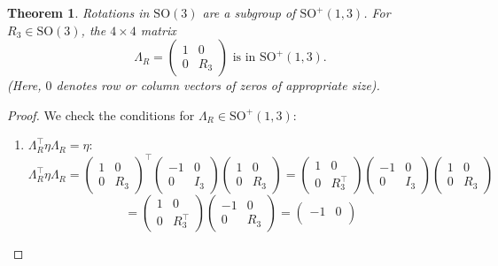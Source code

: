 \documentclass{amsart}
\newtheorem{theorem}{Theorem}[section]
\theoremstyle{definition}
\theoremstyle{remark}
\begin{document}
\begin{theorem}\label{thm:so3_rotations_in_so13}
  Rotations in $\mathrm{SO}(3)$ are a subgroup of $\mathrm{SO}^+(1,3)$. For $R_3\in\mathrm{SO}(3)$, the $4 \times 4$ matrix
  \[
  \Lambda_R =
  \begin{pmatrix}
    1 & 0 \\
    0 & R_3
  \end{pmatrix} \text{ is in } \mathrm{SO}^+(1,3).
  \]
  (Here, $0$ denotes row or column vectors of zeros of appropriate size).
\end{theorem}
\begin{proof}
  We check the conditions for $\Lambda_R \in \mathrm{SO}^+(1,3)$:
  \begin{enumerate}
      \item $\Lambda_R^\top \eta \Lambda_R = \eta$:
      \[
      \Lambda_R^\top\eta \Lambda_R =
      \begin{pmatrix}
        1 & 0 \\
        0 & R_3
      \end{pmatrix}^\top
      \begin{pmatrix}
        -1 & 0 \\
        0 & I_3
      \end{pmatrix}
      \begin{pmatrix}
        1 & 0 \\
        0 & R_3
      \end{pmatrix} =
      \begin{pmatrix}
        1 & 0 \\
        0 & R_3^\top
      \end{pmatrix}
      \begin{pmatrix}
        -1 & 0 \\
        0 & I_3
      \end{pmatrix}
      \begin{pmatrix}
        1 & 0 \\
        0 & R_3
      \end{pmatrix}
      \]
      \[
      =
      \begin{pmatrix}
        1 & 0 \\
        0 & R_3^\top
      \end{pmatrix}
      \begin{pmatrix}
        -1 & 0 \\
        0 & R_3
      \end{pmatrix}
      =
      \begin{pmatrix}
        -1 & 0 \\

\end{pmatrix}\]
\end{enumerate}
\end{proof}
\end{document}
